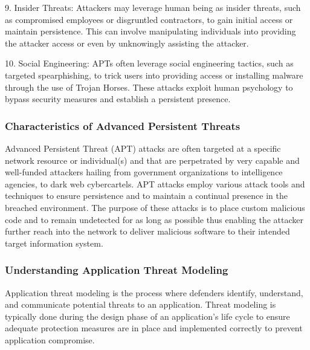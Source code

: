9. Insider Threats: Attackers may leverage human being as insider threats, such as compromised employees or disgruntled contractors, to gain initial access or maintain persistence. This can involve manipulating individuals into providing the attacker access or even by unknowingly assisting the attacker.

10. Social Engineering: APTs often leverage social engineering tactics, such as targeted spearphishing, to trick users into providing access or installing malware through the use of Trojan Horses. These attacks exploit human psychology to bypass security measures and establish a persistent presence.

\subsubsection{Characteristics of Advanced Persistent Threats}
Advanced Persistent Threat (APT) attacks are often targeted at a specific network resource or individual(s) and that are perpetrated by very capable and well-funded attackers hailing from government organizations to intelligence agencies, to dark web cybercartels. APT attacks employ various attack tools and techniques to ensure persistence and to maintain a continual presence in the breached environment. The purpose of these attacks is to place custom malicious code and to remain undetected for as long as possible thus enabling the attacker further reach into the network to deliver malicious software to their intended target information system.

\subsubsection{Understanding Application Threat Modeling}
Application threat modeling is the process where defenders identify, understand, and communicate potential threats to an application. Threat modeling is typically done during the design phase of an application's life cycle to ensure adequate protection measures are in place and implemented correctly to prevent application compromise.

